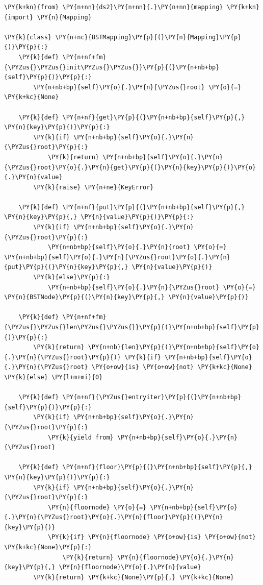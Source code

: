 \begin{Verbatim}[commandchars=\\\{\}]
\PY{k+kn}{from} \PY{n+nn}{ds2}\PY{n+nn}{.}\PY{n+nn}{mapping} \PY{k+kn}{import} \PY{n}{Mapping}

\PY{k}{class} \PY{n+nc}{BSTMapping}\PY{p}{(}\PY{n}{Mapping}\PY{p}{)}\PY{p}{:}
    \PY{k}{def} \PY{n+nf+fm}{\PYZus{}\PYZus{}init\PYZus{}\PYZus{}}\PY{p}{(}\PY{n+nb+bp}{self}\PY{p}{)}\PY{p}{:}
        \PY{n+nb+bp}{self}\PY{o}{.}\PY{n}{\PYZus{}root} \PY{o}{=} \PY{k+kc}{None}

    \PY{k}{def} \PY{n+nf}{get}\PY{p}{(}\PY{n+nb+bp}{self}\PY{p}{,} \PY{n}{key}\PY{p}{)}\PY{p}{:}
        \PY{k}{if} \PY{n+nb+bp}{self}\PY{o}{.}\PY{n}{\PYZus{}root}\PY{p}{:}
            \PY{k}{return} \PY{n+nb+bp}{self}\PY{o}{.}\PY{n}{\PYZus{}root}\PY{o}{.}\PY{n}{get}\PY{p}{(}\PY{n}{key}\PY{p}{)}\PY{o}{.}\PY{n}{value}
        \PY{k}{raise} \PY{n+ne}{KeyError}

    \PY{k}{def} \PY{n+nf}{put}\PY{p}{(}\PY{n+nb+bp}{self}\PY{p}{,} \PY{n}{key}\PY{p}{,} \PY{n}{value}\PY{p}{)}\PY{p}{:}
        \PY{k}{if} \PY{n+nb+bp}{self}\PY{o}{.}\PY{n}{\PYZus{}root}\PY{p}{:}
            \PY{n+nb+bp}{self}\PY{o}{.}\PY{n}{root} \PY{o}{=} \PY{n+nb+bp}{self}\PY{o}{.}\PY{n}{\PYZus{}root}\PY{o}{.}\PY{n}{put}\PY{p}{(}\PY{n}{key}\PY{p}{,} \PY{n}{value}\PY{p}{)}
        \PY{k}{else}\PY{p}{:}
            \PY{n+nb+bp}{self}\PY{o}{.}\PY{n}{\PYZus{}root} \PY{o}{=} \PY{n}{BSTNode}\PY{p}{(}\PY{n}{key}\PY{p}{,} \PY{n}{value}\PY{p}{)}

    \PY{k}{def} \PY{n+nf+fm}{\PYZus{}\PYZus{}len\PYZus{}\PYZus{}}\PY{p}{(}\PY{n+nb+bp}{self}\PY{p}{)}\PY{p}{:}
        \PY{k}{return} \PY{n+nb}{len}\PY{p}{(}\PY{n+nb+bp}{self}\PY{o}{.}\PY{n}{\PYZus{}root}\PY{p}{)} \PY{k}{if} \PY{n+nb+bp}{self}\PY{o}{.}\PY{n}{\PYZus{}root} \PY{o+ow}{is} \PY{o+ow}{not} \PY{k+kc}{None} \PY{k}{else} \PY{l+m+mi}{0}

    \PY{k}{def} \PY{n+nf}{\PYZus{}entryiter}\PY{p}{(}\PY{n+nb+bp}{self}\PY{p}{)}\PY{p}{:}
        \PY{k}{if} \PY{n+nb+bp}{self}\PY{o}{.}\PY{n}{\PYZus{}root}\PY{p}{:}
            \PY{k}{yield from} \PY{n+nb+bp}{self}\PY{o}{.}\PY{n}{\PYZus{}root}

    \PY{k}{def} \PY{n+nf}{floor}\PY{p}{(}\PY{n+nb+bp}{self}\PY{p}{,} \PY{n}{key}\PY{p}{)}\PY{p}{:}
        \PY{k}{if} \PY{n+nb+bp}{self}\PY{o}{.}\PY{n}{\PYZus{}root}\PY{p}{:}
            \PY{n}{floornode} \PY{o}{=} \PY{n+nb+bp}{self}\PY{o}{.}\PY{n}{\PYZus{}root}\PY{o}{.}\PY{n}{floor}\PY{p}{(}\PY{n}{key}\PY{p}{)}
            \PY{k}{if} \PY{n}{floornode} \PY{o+ow}{is} \PY{o+ow}{not} \PY{k+kc}{None}\PY{p}{:}
                \PY{k}{return} \PY{n}{floornode}\PY{o}{.}\PY{n}{key}\PY{p}{,} \PY{n}{floornode}\PY{o}{.}\PY{n}{value}
        \PY{k}{return} \PY{k+kc}{None}\PY{p}{,} \PY{k+kc}{None}


\end{Verbatim}
